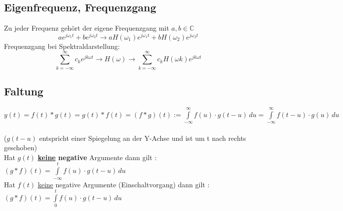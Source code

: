 	\subsection{Eigenfrequenz, Frequenzgang }
    	Zu jeder Frequenz gehört der eigene Frequenzgang mit $a, b \in \mathbb{C}$\\
    	$$a e^{j\omega_1 t} + b e^{j\omega_2 t} \rightarrow a H(\omega_1) e^{j\omega_1 t} + b H(\omega_2) e^{j\omega_2 t}$$
    	Frequenzgang bei Spektraldarstellung: $$\sum_{k=-\infty}^{\infty} c_k e^{jk\omega t} \rightarrow \boxed{H(\omega)}
    	\rightarrow \sum_{k=-\infty}^{\infty} c_k H(\omega k) e^{jk\omega t}$$			
	
	\subsection{Faltung }
	$y(t) = f(t)\ast g(t) = g(t) \ast f(t) = \boxed{ (f \ast g)(t) :=
	\int\limits_{-\infty}^\infty f(u) \cdot g(t-u) \, du} =
	\int\limits_{-\infty}^\infty f(t-u) \cdot g(u)\,du $ \\
	\\
	($g(t-u)$ entspricht einer Spiegelung an der Y-Achse und ist um t nach rechts geschoben)\\
	
	Hat $g\left(t\right)$ \textbf{\underline{keine} negative} Argumente dann gilt :
	$\left(g \ast f \right)\left(t\right)=\int\limits_{-\infty}^t f(u) \cdot
	g(t-u)\,du$\\
	Hat $f\left(t\right)$ \underline{keine} negative Argumente (Einschaltvorgang) dann gilt :
	$\left(g \ast f \right)\left(t\right)=\int\limits_{0}^t f(u) \cdot
	g(t-u)\,du$\\
	
